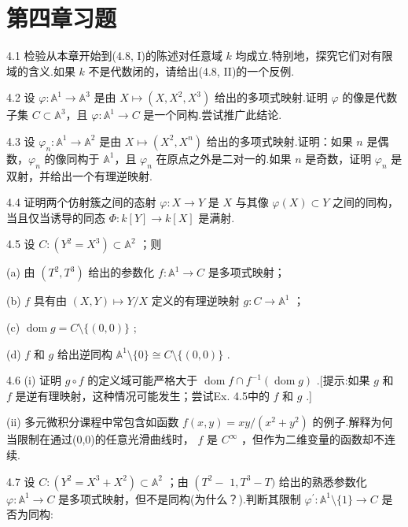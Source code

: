 \section{第四章习题}

4.1 检验从本章开始到(4.8, I)的陈述对任意域 \(k\) 均成立.特别地，探究它们对有限域的含义.如果 \(k\) 不是代数闭的，请给出(4.8, II)的一个反例.

4.2 设 \(\varphi : {\mathbb{A}}^{1} \rightarrow  {\mathbb{A}}^{3}\) 是由 \(X \mapsto  (X, X^2, X^3)\) 给出的多项式映射.证明 \(\varphi\) 的像是代数子集 \(C \subset  {\mathbb{A}}^{3}\)，且 \(\varphi : {\mathbb{A}}^{1} \rightarrow  C\) 是一个同构.尝试推广此结论.

4.3 设 \({\varphi }_{n} : {\mathbb{A}}^{1} \rightarrow  {\mathbb{A}}^{2}\) 是由 \(X \mapsto  (X^2, X^n)\) 给出的多项式映射.证明：如果 \(n\) 是偶数，\({\varphi }_{n}\) 的像同构于 \({\mathbb{A}}^{1}\)，且 \({\varphi }_{n}\) 在原点之外是二对一的.如果 \(n\) 是奇数，证明 \({\varphi }_{n}\) 是双射，并给出一个有理逆映射.

4.4 证明两个仿射簇之间的态射 \(\varphi : X \rightarrow  Y\) 是 \(X\) 与其像 \(\varphi(X) \subset  Y\) 之间的同构，当且仅当诱导的同态 \(\Phi : k[Y] \rightarrow  k[X]\) 是满射.

4.5 设 \(C : \left( {{Y}^{2} = {X}^{3}}\right)  \subset  {\mathbb{A}}^{2}\) ；则

(a) 由 \(\left( {{T}^{2},{T}^{3}}\right)\) 给出的参数化 \(f : {\mathbb{A}}^{1} \rightarrow  C\) 是多项式映射；

(b) \(f\) 具有由 \(\left( {X,Y}\right)  \mapsto  Y/X\) 定义的有理逆映射 \(g : C \rightarrow  {\mathbb{A}}^{1}\) ；

(c) \(\operatorname{dom}g = C \setminus  \{ \left( {0,0}\right) \}\) ;

(d) \(f\) 和 \(g\) 给出逆同构 \({\mathbb{A}}^{1} \setminus  \{ 0\}  \cong  C \setminus  \{ \left( {0,0}\right) \}\) .

4.6 (i) 证明 \(g \circ  f\) 的定义域可能严格大于 \(\operatorname{dom}f \cap  {f}^{-1}\left( {\operatorname{dom}g}\right)\) .[提示:如果 \(g\) 和 \(f\) 是逆有理映射，这种情况可能发生；尝试Ex. 4.5中的 \(f\) 和 \(g\) .]

(ii) 多元微积分课程中常包含如函数 \(f\left( {x,y}\right)  = {xy}/\left( {{x}^{2} + {y}^{2}}\right)\) 的例子.解释为何当限制在通过(0,0)的任意光滑曲线时， \(f\) 是 \({C}^{\infty }\) ，但作为二维变量的函数却不连续.

4.7 设 \(C : \left( {{Y}^{2} = {X}^{3} + {X}^{2}}\right)  \subset  {\mathbb{A}}^{2}\) ；由 \(\left( {{T}^{2} - }\right.\)  \(1,{T}^{3} - T)\) 给出的熟悉参数化 \(\varphi  : {\mathbb{A}}^{1} \rightarrow  C\) 是多项式映射，但不是同构(为什么？).判断其限制 \({\varphi }^{\prime } : {\mathbb{A}}^{1} \setminus  \{ 1\}  \rightarrow  C\) 是否为同构:

